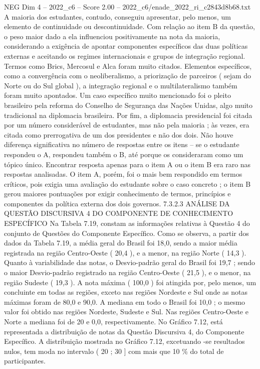 \begin{textsample}{NEG Dim 4 – 2022\_c6 – Score 2.00 – 2022\_c6/enade\_2022\_ri\_c2843d8b68.txt}
A maioria dos estudantes, contudo, conseguiu apresentar, pelo menos, um elemento de continuidade ou descontinuidade.
Com relação ao item B da questão, o peso maior dado a ela influenciou positivamente na nota da maioria, considerando a exigência de apontar componentes específicos das duas políticas externas e aceitando os regimes internacionais e grupos de integração regional.
Termos como Brics, Mercosul e Alca foram muito citados.
Elementos específicos, como a convergência com o neoliberalismo, a priorização de parceiros ( sejam do Norte ou do Sul global ), a integração regional e o multilateralismo também foram muito apontados.
Um caso específico muito mencionado foi o pleito brasileiro pela reforma do Conselho de Segurança das Nações Unidas, algo muito tradicional na diplomacia brasileira.
Por fim, a diplomacia presidencial foi citada por um número considerável de estudantes, mas não pela maioria ; às vezes, era citada como prerrogativa de um dos presidentes e não dos dois.
Não houve diferença significativa no número de respostas entre os itens – se o estudante respondeu o A, respondeu também o B, até porque os consideraram como um tópico único.
Encontrar resposta apenas para o item A ou o item B era raro nas respostas analisadas.
O item A, porém, foi o mais bem respondido em termos críticos, pois exigia uma avaliação do estudante sobre o caso concreto ; o item B gerou maiores pontuações por exigir conhecimento de termos, princípios e componentes da política externa dos dois governos. 7.3.2.3 ANÁLISE DA QUESTÃO DISCURSIVA 4 DO COMPONENTE DE CONHECIMENTO ESPECÍFICO Na Tabela 7.19, constam as informações relativas à Questão 4 do conjunto de Questões do Componente Específico.
Como se observa, a partir dos dados da Tabela 7.19, a média geral do Brasil foi 18,0, sendo a maior média registrada na região Centro-Oeste ( 20,4 ), e a menor, na região Norte ( 14,3 ).
Quanto à variabilidade das notas, o Desvio-padrão geral do Brasil foi 19,7 ; sendo o maior Desvio-padrão registrado na região Centro-Oeste ( 21,5 ), e o menor, na região Sudeste ( 19,3 ).
A nota máxima ( 100,0 ) foi atingida por, pelo menos, um concluinte em todas as regiões, exceto nas regiões Nordeste e Sul onde as notas máximas foram de 80,0 e 90,0.
A mediana em todo o Brasil foi 10,0 ; o mesmo valor foi obtido nas regiões Nordeste, Sudeste e Sul.
Nas regiões Centro-Oeste e Norte a mediana foi de 20 e 0,0, respectivamente.
No Gráfico 7.12, está representada a distribuição de notas da Questão Discursiva 4, do Componente Específico.
A distribuição mostrada no Gráfico 7.12, excetuando -se resultados nulos, tem moda no intervalo ( 20 ; 30 ] com mais que 10 \% do total de participantes.

\end{textsample}
